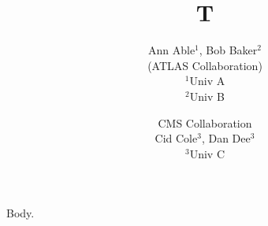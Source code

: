 \documentclass{article}
\begin{document}
\title{T}
\author{Ann Able$^{1}$, Bob Baker$^{2}$ \\ (ATLAS Collaboration) \\ $^{1}$Univ A \\ $^{2}$Univ B \and CMS Collaboration
\\ Cid Cole$^{3}$, Dan Dee$^{3}$ \\ $^{3}$Univ C}
\maketitle
Body.
\end{document}
